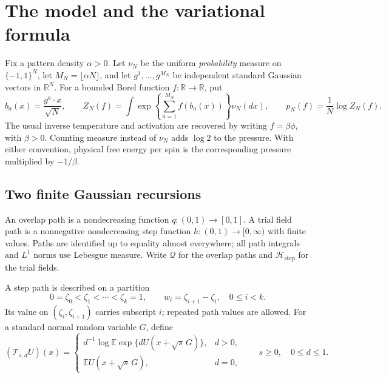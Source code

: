 \section{The model and the variational formula}\label{sec:model}

Fix a pattern density $\alpha>0$. Let $\nu_N$ be the uniform \emph{probability}
measure on $\{-1,1\}^N$, let $M_N=\lfloor\alpha N\rfloor$, and let
$g^1,\ldots,g^{M_N}$ be independent standard Gaussian vectors in
$\mathbb R^N$. For a bounded Borel function $f:\mathbb R\to\mathbb R$, put
\begin{equation}\label{def:pressure}
 b_a(x)=\frac{g^a\cdot x}{\sqrt N},\qquad
 Z_N(f)=\int\exp\!\left\{\sum_{a=1}^{M_N}f(b_a(x))\right\}\nu_N(dx),
 \qquad p_N(f)=\frac1N\log Z_N(f).
\end{equation}
The usual inverse temperature and activation are recovered by writing
$f=\beta\phi$, with $\beta>0$. Counting measure instead of $\nu_N$ adds
$\log2$ to the pressure. With either convention, physical free energy per
spin is the corresponding pressure multiplied by $-1/\beta$.

\subsection{Two finite Gaussian recursions}

An overlap path is a nondecreasing function $q:(0,1)\to[0,1]$. A trial field
path is a nonnegative nondecreasing step function $h:(0,1)\to[0,\infty)$
with finite values. Paths are identified up to equality almost everywhere;
all path integrals and $L^1$ norms use Lebesgue measure. Write $\mathcal Q$
for the overlap paths and $\mathcal H_{\mathrm{step}}$ for the trial fields.

A step path is described on a partition
\begin{equation}\label{def:partition}
 0=\zeta_0<\zeta_1<\cdots<\zeta_k=1,
 \qquad w_i=\zeta_{i+1}-\zeta_i,\quad 0\le i<k.
\end{equation}
Its value on $(\zeta_i,\zeta_{i+1})$ carries subscript $i$; repeated path
values are allowed. For a standard normal random variable $G$, define
\begin{equation}\label{def:transform}
 (\mathcal T_{s,d}U)(x)=
 \begin{cases}
 d^{-1}\log\mathbb E\exp\{dU(x+\sqrt s\,G)\},&d>0,\\
 \mathbb E U(x+\sqrt s\,G),&d=0,
 \end{cases}
 \qquad s\ge0,\quad 0\le d\le1.
\end{equation}

